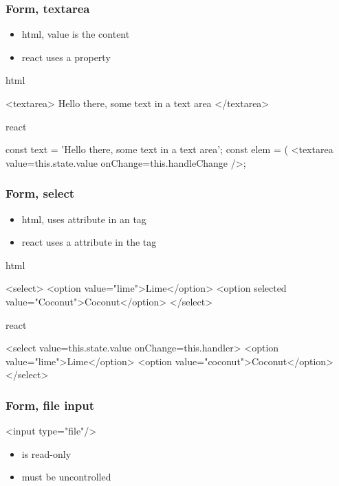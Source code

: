 \begin{frame}[fragile] \frametitle{Form, textarea}
\begin{itemize}
  \item html, value is the content
  \item react uses a  property
\end{itemize}
\vspace{3mm}
html
\begin{CodeBox}{}
<textarea>
  Hello there, some text in a text area
</textarea>
\end{CodeBox}
\vspace{3mm}
react
\begin{CodeBox}{}
const text = 'Hello there, some text in a text area';
const elem = (
  <textarea value={this.state.value}
               onChange={this.handleChange} />;
\end{CodeBox}
\end{frame}

\begin{frame}[fragile] \frametitle{Form, select}
\begin{itemize}
  \item html, uses  attribute in an  tag
  \item react uses a  attribute in the  tag
\end{itemize}
\vspace{3mm}
html
\begin{CodeBox}{}
<select>
  <option value="lime">Lime</option>
  <option selected value="Coconut">Coconut</option>
</select>\end{CodeBox}
\vspace{3mm}
react
\begin{CodeBox}{}
<select value={this.state.value} onChange={this.handler}>
  <option value="lime">Lime</option>
  <option value="coconut">Coconut</option>
</select>\end{CodeBox}
\end{frame}

\begin{frame}[fragile] \frametitle{Form, file input}
\begin{CodeBox}{}
<input type="file"/>
\end{CodeBox}
\vspace{8mm}

\begin{itemize}
  \item is read-only
  \item must be uncontrolled
\end{itemize}
\end{frame}

